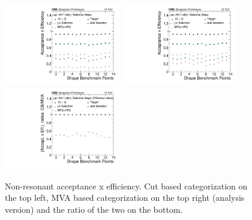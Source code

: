 \begin{figure}[thb]
  \centering
  \includegraphics[width=0.45\textwidth]{figures/sec-efficiency_plots/nonres_effs.pdf}\hfil
  \includegraphics[width=0.45\textwidth]{figures/sec-efficiency_plots/nonres_effs_HHtagger.pdf}\hfil
  \includegraphics[width=0.45\textwidth]{figures/sec-efficiency_plots/nonres_effs_Ratio_CutBased_MVAHHTagger.pdf}\hfil
  \caption{Non-resonant acceptance x efficiency. Cut based categorization on the top left, MVA based categorization on the top right (analysis version) and the ratio of the two on the bottom.}
  \label{fig:cutflow-signal-NR-mva}
\end{figure}

